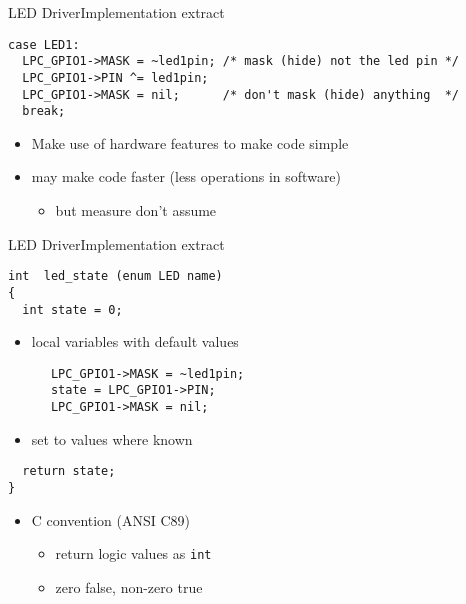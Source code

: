 \documentclass[svgnames,x11names]{beamer}
\begin{document}
\begin{frame}[fragile]{LED Driver}{Implementation extract}
  \begin{verbatim}
case LED1:
  LPC_GPIO1->MASK = ~led1pin; /* mask (hide) not the led pin */
  LPC_GPIO1->PIN ^= led1pin;
  LPC_GPIO1->MASK = nil;      /* don't mask (hide) anything  */
  break;
\end{verbatim}

\begin{itemize}
\item Make use of hardware features to make code simple
\item may make code faster (less operations in software) 
  \begin{itemize}
  \item but measure \alert{don't} assume
  \end{itemize}
\end{itemize}
\end{frame}
                    
\begin{frame}[fragile]{LED Driver}{Implementation extract}
  \begin{verbatim}
int  led_state (enum LED name)
{
  int state = 0;
\end{verbatim}
\begin{itemize}
\item local variables with default values
\end{itemize}
\begin{verbatim}
      LPC_GPIO1->MASK = ~led1pin;
      state = LPC_GPIO1->PIN;
      LPC_GPIO1->MASK = nil;
\end{verbatim}
\begin{itemize}
\item set to values where known
\end{itemize}
\begin{verbatim}
  return state;
}  
  \end{verbatim}
  \begin{itemize}
  \item C convention (ANSI C89)
    \begin{itemize}
    \item return logic values as \texttt{int}
    \item zero false, non-zero true
    \end{itemize}
  \end{itemize}
\end{frame}



\end{document}
